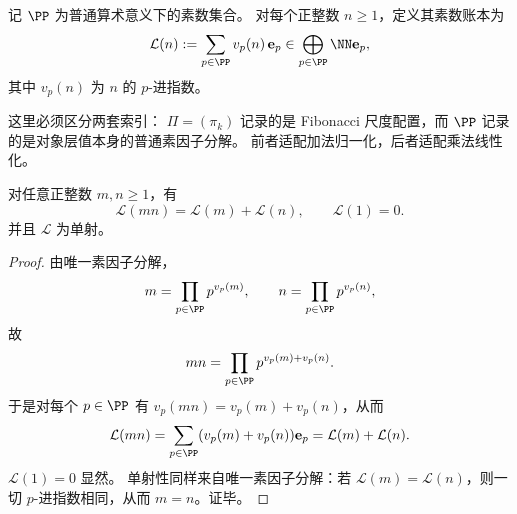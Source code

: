 \begin{definition}[普通素数账本]\label{def:ordinary-prime-ledger}
记 \(\PP\) 为普通算术意义下的素数集合。
对每个正整数 \(n\ge1\)，定义其素数账本为
\[
\mathcal L(n)
:=
\sum_{p\in\PP}v_p(n)\,\mathbf e_p
\in
\bigoplus_{p\in\PP}\NN \mathbf e_p,
\]
其中 \(v_p(n)\) 为 \(n\) 的 \(p\)-进指数。

这里必须区分两套索引：
\(\Pi=(\pi_k)\) 记录的是 Fibonacci 尺度配置，而 \(\PP\) 记录的是对象层值本身的普通素因子分解。
前者适配加法归一化，后者适配乘法线性化。
\end{definition}

\begin{proposition}[普通素数账本线性化值的乘法]\label{prop:ordinary-prime-ledger-linearizes-multiplication}
对任意正整数 \(m,n\ge1\)，有
\[
\mathcal L(mn)=\mathcal L(m)+\mathcal L(n),
\qquad
\mathcal L(1)=0.
\]
并且 \(\mathcal L\) 为单射。
\end{proposition}

\begin{proof}
由唯一素因子分解，
\[
m=\prod_{p\in\PP}p^{v_p(m)},
\qquad
n=\prod_{p\in\PP}p^{v_p(n)},
\]
故
\[
mn=\prod_{p\in\PP}p^{v_p(m)+v_p(n)}.
\]
于是对每个 \(p\in\PP\) 有 \(v_p(mn)=v_p(m)+v_p(n)\)，从而
\[
\mathcal L(mn)
=\sum_{p\in\PP}(v_p(m)+v_p(n))\mathbf e_p
=\mathcal L(m)+\mathcal L(n).
\]
\(\mathcal L(1)=0\) 显然。
单射性同样来自唯一素因子分解：若 \(\mathcal L(m)=\mathcal L(n)\)，则一切 \(p\)-进指数相同，从而 \(m=n\)。证毕。
\end{proof}

